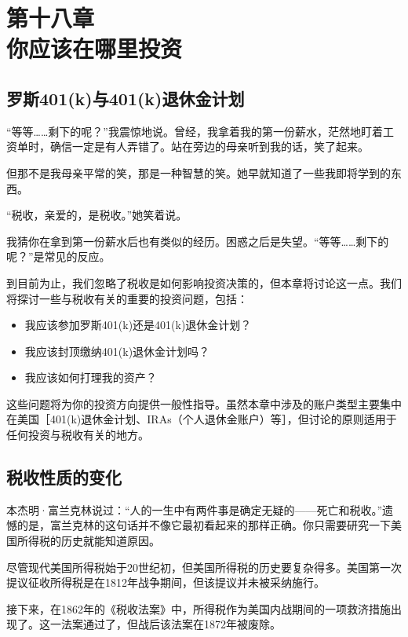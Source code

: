 \section[第十八章\q 你应该在哪里投资]{第十八章\\ 你应该在哪里投资}
\renewcommand{\bookchapter}{18}
\setcounter{figure}{0}
\setcounter{table}{0}

\subsection{罗斯401(k)与401(k)退休金计划}
“等等……剩下的呢？”我震惊地说。曾经，我拿着我的第一份薪水，茫然地盯着工资单时，确信一定是有人弄错了。站在旁边的母亲听到我的话，笑了起来。

但那不是我母亲平常的笑，那是一种智慧的笑。她早就知道了一些我即将学到的东西。

“税收，亲爱的，是税收。”她笑着说。

我猜你在拿到第一份薪水后也有类似的经历。困惑之后是失望。“等等……剩下的呢？”是常见的反应。

到目前为止，我们忽略了税收是如何影响投资决策的，但本章将讨论这一点。我们将探讨一些与税收有关的重要的投资问题，包括：

\begin{itemize}
\item 我应该参加罗斯401(k)还是401(k)退休金计划？
\item 我应该封顶缴纳401(k)退休金计划吗？
\item 我应该如何打理我的资产？
\end{itemize}

这些问题将为你的投资方向提供一般性指导。虽然本章中涉及的账户类型主要集中在美国［401(k)退休金计划、IRAs（个人退休金账户）等］，但讨论的原则适用于任何投资与税收有关的地方。

\subsection{税收性质的变化}

本杰明·富兰克林说过：“人的一生中有两件事是确定无疑的——死亡和税收。”遗憾的是，富兰克林的这句话并不像它最初看起来的那样正确。你只需要研究一下美国所得税的历史就能知道原因。

尽管现代美国所得税始于20世纪初，但美国所得税的历史要复杂得多。美国第一次提议征收所得税是在1812年战争期间，但该提议并未被采纳施行。

接下来，在1862年的《税收法案》中，所得税作为美国内战期间的一项救济措施出现了。这一法案通过了，但战后该法案在1872年被废除。

